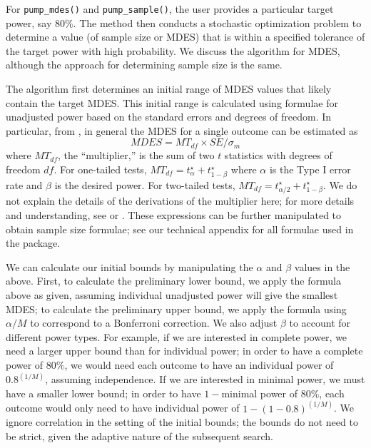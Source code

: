 \documentclass[
]{jss}
\begin{document}
For \texttt{pump\_mdes()} and \texttt{pump\_sample()}, the user provides
a particular target power, say \(80\%\). The method then conducts a
stochastic optimization problem to determine a value (of sample size or
MDES) that is within a specified tolerance of the target power with high
probability. We discuss the algorithm for MDES, although the approach
for determining sample size is the same.

The algorithm first determines an initial range of MDES values that
likely contain the target MDES. This initial range is calculated using
formulae for unadjusted power based on the standard errors and degrees
of freedom. In particular, from \citet{RN4473}, in general the MDES for
a single outcome can be estimated as
\[ MDES = MT_{df} \times SE / \sigma_{m} \] where \(MT_{df}\), the
``multiplier,'' is the sum of two \(t\) statistics with degrees of
freedom \(df\). For one-tailed tests,
\(MT_{df} = t_{\alpha}^\star + t_{1-\beta}^\star\) where \(\alpha\) is
the Type I error rate and \(\beta\) is the desired power. For two-tailed
tests, \(MT_{df} = t_{\alpha/2}^\star + t_{1-\beta}^\star\). We do not
explain the details of the derivations of the multiplier here; for more
details and understanding, see \citet{RN4473} or \citet{RN27978}. These
expressions can be further manipulated to obtain sample size formulae;
see our technical appendix for all formulae used in the package.

We can calculate our initial bounds by manipulating the \(\alpha\) and
\(\beta\) values in the above. First, to calculate the preliminary lower
bound, we apply the formula above as given, assuming individual
unadjusted power will give the smallest MDES; to calculate the
preliminary upper bound, we apply the formula using \(\alpha/M\) to
correspond to a Bonferroni correction. We also adjust \(\beta\) to
account for different power types. For example, if we are interested in
complete power, we need a larger upper bound than for individual power;
in order to have a complete power of \(80\%\), we would need each
outcome to have an individual power of \(\text{0.8}^{(1/M)}\), assuming
independence. If we are interested in minimal power, we must have a
smaller lower bound; in order to have \(1-\)minimal power of \(80\%\),
each outcome would only need to have individual power of
\(1 - (1 - \text{0.8})^{(1/M)}\). We ignore correlation in the setting
of the initial bounds; the bounds do not need to be strict, given the
adaptive nature of the subsequent search.
\end{document}

